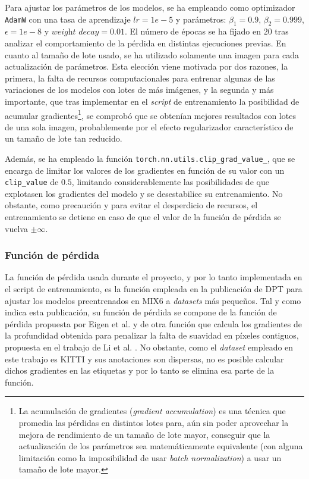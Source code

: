 Para ajustar los parámetros de los modelos, se ha empleando como optimizador \texttt{AdamW} con una tasa de aprendizaje $lr = 1e-5$ y parámetros: $\beta_1 = 0.9$, $\beta_2 = 0.999$, $\epsilon = 1e-8$ y $\textit{weight decay} = 0.01$. El número de épocas se ha fijado en $20$ tras analizar el comportamiento de la pérdida en distintas ejecuciones previas. En cuanto al tamaño de lote usado, se ha utilizado solamente una imagen para cada actualización de parámetros. Esta elección viene motivada por dos razones, la primera, la falta de recursos computacionales para entrenar algunas de las variaciones de los modelos con lotes de más imágenes, y la segunda y más importante, que tras implementar en el \textit{script} de entrenamiento la posibilidad de acumular gradientes\footnote{La acumulación de gradientes (\textit{gradient accumulation}) es una técnica que promedia las pérdidas en distintos lotes para, aún sin poder aprovechar la mejora de rendimiento de un tamaño de lote mayor, conseguir que la actualización de los parámetros sea matemáticamente equivalente (con alguna limitación como la imposibilidad de usar \textit{batch normalization}) a usar un tamaño de lote mayor.}, se comprobó que se obtenían mejores resultados con lotes de una sola imagen, probablemente por el efecto regularizador característico de un tamaño de lote tan reducido.

Además, se ha empleado la función \texttt{torch.nn.utils.clip\_grad\_value\_}, que se encarga de limitar los valores de los gradientes en función de su valor con un \texttt{clip\_value} de $0.5$, limitando considerablemente las posibilidades de que explotasen los gradientes del modelo y se desestabilice su entrenamiento. No obstante, como precaución y para evitar el desperdicio de recursos, el entrenamiento se detiene en caso de que el valor de la función de pérdida se vuelva $\pm \infty$.


\subsubsection{Función de pérdida}
La función de pérdida usada durante el proyecto, y por lo tanto implementada en el script de entrenamiento, es la función empleada en la publicación de DPT \cite{visiontransformersDPT} para ajustar los modelos preentrenados en MIX6 a \textit{datasets} más pequeños. Tal y como indica esta publicación, su función de pérdida se compone de la función de pérdida propuesta por Eigen et al. \cite{eigen-multi-scale} y de otra función que calcula los gradientes de la profundidad obtenida para penalizar la falta de suavidad en píxeles contiguos, propuesta en el trabajo de Li et al. \cite{MegaDepthLi18}. No obstante, como el \textit{dataset} empleado en este trabajo es KITTI y sus anotaciones son dispersas, no es posible calcular dichos gradientes en las etiquetas y por lo tanto se elimina esa parte de la función. 

